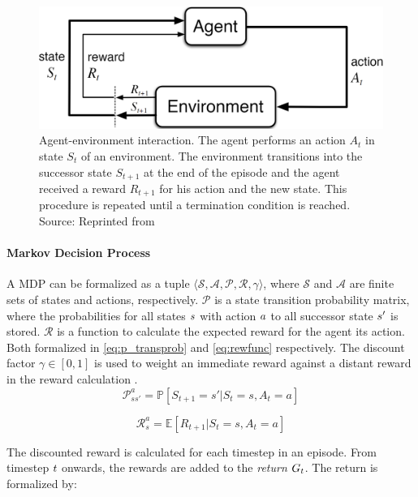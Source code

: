 \begin{figure}[H]
  \centering
  \includegraphics[scale=0.25]{images/rl_interaction}
  \caption[Agent-environment interaction]{Agent-environment interaction. The agent performs an action $A_t$ in state $S_t$ of an environment. The environment transitions into the successor state $S_{t+1}$ at the end of the episode and the agent received a reward $R_{t+1}$ for his action and the new state. This procedure is repeated until a termination condition is reached. Source: Reprinted from \cite[p.48]{richardsutton2018} }
  \label{fig:agent_env_loop}
\end{figure}


\paragraph[MDP]{Markov Decision Process}
\label{para:mdp}
A MDP can be formalized as a tuple \(\langle \mathcal{S, A, P, R, } \gamma \rangle\), where \(\mathcal{S}\) and \(\mathcal{A}\) are finite sets of states and actions, respectively. \(\mathcal{P}\) is a state transition probability matrix, where the probabilities for all states $\mathnormal{s}$ with action $\mathnormal{a}$ to all successor state $\mathnormal{s'}$ is stored. \(\mathcal{R}\) is a function to calculate the expected reward for the agent its action. Both formalized in \ref{eq:p_transprob} and \ref{eq:rewfunc} respectively. The discount factor \(\gamma \in [0,1]\) is used to weight an immediate reward against a distant reward in the reward calculation \cite{silver2020MDP}.
\begin{equation}
\mathcal{P}_{ss'}^{a} = \mathbb{P}[S_{t+1} = s' | S_{t} = s, A_{t} = a]
\label{eq:p_transprob}
\end{equation}


\begin{equation}
\mathcal{R}_{s}^{a} = \mathbb{E}[R_{t+1} | S_{t} = s, A_{t} = a] 
\label{eq:rewfunc}
\end{equation}

The discounted reward is calculated for each timestep in an episode. From timestep $\mathnormal{t}$ onwards, the rewards are added to the \textit{return} $\mathnormal{G}_{t}$. The return is formalized by:

